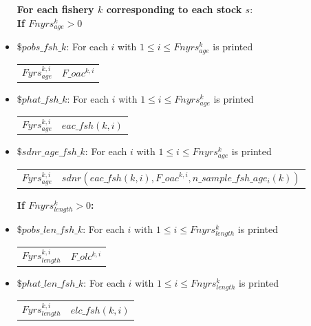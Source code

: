 \documentclass{article}
\begin{document}
\begin{itemize}
\textbf{For each fishery $k$ corresponding to each stock $s$}:\\
\textbf{If $Fnyrs^k_{age}>0$}
\item $\$ pobs\_fsh\_k$:
For each $i$ with $1\leq i \leq Fnyrs^k_{age}$ is printed

\begin{center}
    \begin{tabular}{c c}
        $Fyrs^{k,i}_{age}$ &  $F\_oac^{k,i}$\\
        \end{tabular}
\end{center}

\item $\$ phat\_fsh\_k$: For each $i$ with $1\leq i \leq Fnyrs^k_{age}$ is printed

\begin{center}
    \begin{tabular}{c c}
        $Fyrs^{k,i}_{age}$ &  $eac\_fsh(k,i)$\\
        \end{tabular}
\end{center}

\item $\$ sdnr\_age\_fsh\_k$: For each $i$ with $1\leq i \leq Fnyrs^k_{age}$ is printed

\begin{center}
    \begin{tabular}{c c}
        $Fyrs^{k,i}_{age}$ &  $sdnr( eac\_fsh(k,i),F\_oac^{k,i},n\_sample\_fsh\_age_i(k))$\\
          
    \end{tabular}
\end{center}
\textbf{If $Fnyrs^k_{length}>0$:}
\item $\$ pobs\_len\_fsh\_k$: For each $i$ with $1\leq i \leq Fnyrs^k_{length}$ is printed
\begin{center}
    \begin{tabular}{c c}
       $Fyrs^{k,i}_{length}$  &  $F\_olc^{k,i}$\\
\end{tabular}
\end{center}

\item $\$ phat\_len\_fsh\_k$: For each $i$ with $1\leq i \leq Fnyrs^k_{length}$ is printed
\begin{center}
    \begin{tabular}{c c}
       $Fyrs^{k,i}_{length}$  &  $elc\_fsh(k,i)$\\
\end{tabular}
\end{center}


\end{itemize}
\end{document}
